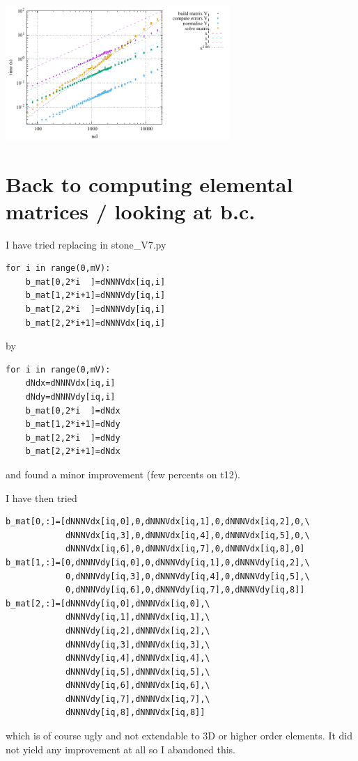 \begin{center}
\includegraphics[width=8.5cm]{python_codes/fieldstone_150/results/times_V6}
\end{center}


\section*{Back to computing elemental matrices / looking at b.c.}

I have tried replacing in {\pythonfile stone\_V7.py} 
\begin{lstlisting}
for i in range(0,mV):
    b_mat[0,2*i  ]=dNNNVdx[iq,i]
    b_mat[1,2*i+1]=dNNNVdy[iq,i]
    b_mat[2,2*i  ]=dNNNVdy[iq,i]
    b_mat[2,2*i+1]=dNNNVdx[iq,i]
\end{lstlisting}
by 
\begin{lstlisting}
for i in range(0,mV):
    dNdx=dNNNVdx[iq,i] 
    dNdy=dNNNVdy[iq,i] 
    b_mat[0,2*i  ]=dNdx
    b_mat[1,2*i+1]=dNdy
    b_mat[2,2*i  ]=dNdy
    b_mat[2,2*i+1]=dNdx
\end{lstlisting}
and found a minor improvement (few percents on t12).

I have then tried 
\begin{lstlisting}
b_mat[0,:]=[dNNNVdx[iq,0],0,dNNNVdx[iq,1],0,dNNNVdx[iq,2],0,\
            dNNNVdx[iq,3],0,dNNNVdx[iq,4],0,dNNNVdx[iq,5],0,\
            dNNNVdx[iq,6],0,dNNNVdx[iq,7],0,dNNNVdx[iq,8],0]
b_mat[1,:]=[0,dNNNVdy[iq,0],0,dNNNVdy[iq,1],0,dNNNVdy[iq,2],\
            0,dNNNVdy[iq,3],0,dNNNVdy[iq,4],0,dNNNVdy[iq,5],\
            0,dNNNVdy[iq,6],0,dNNNVdy[iq,7],0,dNNNVdy[iq,8]]
b_mat[2,:]=[dNNNVdy[iq,0],dNNNVdx[iq,0],\
            dNNNVdy[iq,1],dNNNVdx[iq,1],\
            dNNNVdy[iq,2],dNNNVdx[iq,2],\
            dNNNVdy[iq,3],dNNNVdx[iq,3],\
            dNNNVdy[iq,4],dNNNVdx[iq,4],\
            dNNNVdy[iq,5],dNNNVdx[iq,5],\
            dNNNVdy[iq,6],dNNNVdx[iq,6],\
            dNNNVdy[iq,7],dNNNVdx[iq,7],\
            dNNNVdy[iq,8],dNNNVdx[iq,8]]
\end{lstlisting}
which is of course ugly and not extendable to 3D or higher order elements. 
It did not yield any improvement at all so I abandoned this.

